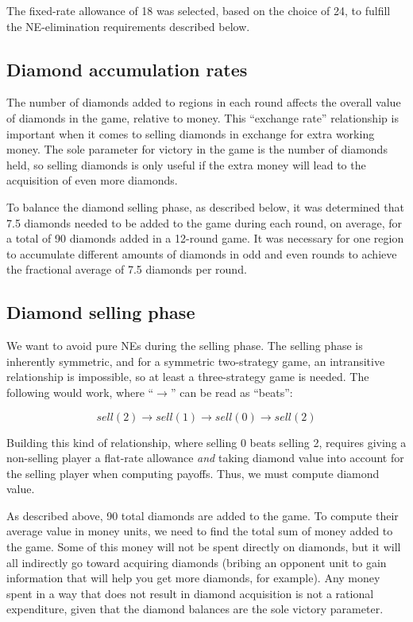 \documentclass[8pt]{extarticle}
\begin{document}
The fixed-rate allowance of 18 was selected, based on the choice of 24, to fulfill the NE-elimination requirements described below.


\subsection{Diamond accumulation rates}
The number of diamonds added to regions in each round affects the overall value of diamonds in the game, relative to money.  This ``exchange rate'' relationship is important when it comes to selling diamonds in exchange for extra working money.  The sole parameter for victory in the game is the number of diamonds held, so selling diamonds is only useful if the extra money will lead to the acquisition of even more diamonds.

To balance the diamond selling phase, as described below, it was determined that 7.5 diamonds needed to be added to the game during each round, on average, for a total of 90 diamonds added in a 12-round game.  It was necessary for one region to accumulate different amounts of diamonds in odd and even rounds to achieve the fractional average of 7.5 diamonds per round.


\subsection{Diamond selling phase}
We want to avoid pure NEs during the selling phase.  The selling phase is inherently symmetric, and for a symmetric two-strategy game, an intransitive relationship is impossible, so at least a three-strategy game is needed.  The following would work, where ``$\longrightarrow$'' can be read as ``beats'':

\[ sell(2) \longrightarrow sell(1) \longrightarrow sell(0) \longrightarrow sell(2)
\]

Building this kind of relationship, where selling 0 beats selling 2, requires giving a non-selling player a flat-rate allowance {\it and} taking diamond value into account for the selling player when computing payoffs.  Thus, we must compute diamond value.

As described above, 90 total diamonds are added to the game.  To compute their average value in money units, we need to find the total sum of money added to the game.  Some of this money will not be spent directly on diamonds, but it will all indirectly go toward acquiring diamonds (bribing an opponent unit to gain information that will help you get more diamonds, for example).  Any money spent in a way that does not result in diamond acquisition is not a rational expenditure, given that the diamond balances are the sole victory parameter.
\end{document}
